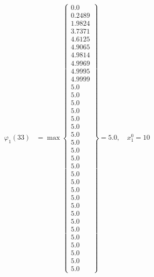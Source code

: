 \documentclass{article}
\begin{document}
\begin{align*}
\varphi_{1}(33) &= \max \left\{ \begin{array}{c}
0.0 \\
 0.2489 \\
 1.9824 \\
 3.7371 \\
 4.6125 \\
 4.9065 \\
 4.9814 \\
 4.9969 \\
 4.9995 \\
 4.9999 \\
 5.0 \\
 5.0 \\
 5.0 \\
 5.0 \\
 5.0 \\
 5.0 \\
 5.0 \\
 5.0 \\
 5.0 \\
 5.0 \\
 5.0 \\
 5.0 \\
 5.0 \\
 5.0 \\
 5.0 \\
 5.0 \\
 5.0 \\
 5.0 \\
 5.0 \\
 5.0 \\
 5.0 \\
 5.0 \\
 5.0 \\
 5.0
\end{array} \right\}=5.0, \quad x_{1}^0=10\\
  

\end{align*}
\end{document}
